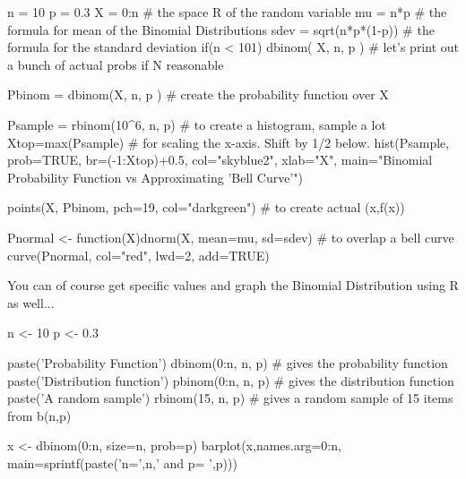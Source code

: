 \documentclass[10pt,]{book}
\numberwithin{equation}{section}
\begin{document}
\begin{sageinput}
n = 10
p = 0.3
X = 0:n    # the space R of the random variable 
mu = n*p      # the formula for mean of the Binomial Distributions
sdev = sqrt(n*p*(1-p))  # the formula for the standard deviation
if(n < 101){
dbinom( X, n, p )   # let's print out a bunch of actual probs if N reasonable
}

Pbinom = dbinom(X, n, p )  # create the probability function over X

Psample = rbinom(10^6, n, p)  # to create a histogram, sample a lot
Xtop=max(Psample)          # for scaling the x-axis. Shift by 1/2 below.
hist(Psample, prob=TRUE, br=(-1:Xtop)+0.5, col="skyblue2", xlab="X", 
  main="Binomial Probability Function vs Approximating 'Bell Curve'")

points(X, Pbinom, pch=19, col="darkgreen")  # to create actual (x,f(x))

Pnormal <- function(X){dnorm(X, mean=mu, sd=sdev)}   # to overlap a bell curve
curve(Pnormal, col="red", lwd=2, add=TRUE)
\end{sageinput}
%
\par
\hypertarget{p-927}{}%
You can of course get specific values and graph the Binomial Distribution using R as well...%
\par
\hypertarget{p-928}{}%
\leavevmode%
\begin{sageinput}
n <- 10
p <- 0.3

paste('Probability Function')
dbinom(0:n, n, p)   # gives the probability function
paste('Distribution function')
pbinom(0:n, n, p)   # gives the distribution function
paste('A random sample')
rbinom(15, n, p)    # gives a random sample of 15 items from b(n,p)

x <- dbinom(0:n, size=n, prob=p)
barplot(x,names.arg=0:n, main=sprintf(paste('n=',n,' and p= ',p)))
\end{sageinput}
%
%
%
\typeout{************************************************}
\typeout{************************************************}
%
\end{document}
